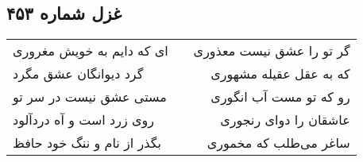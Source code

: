 \begin{center}
\section*{غزل شماره ۴۵۳}
\label{sec:sh453}
\begin{longtable}{l p{0.5cm} r}
ای که دایم به خویش مغروری
&&
گر تو را عشق نیست معذوری
\\
گرد دیوانگان عشق مگرد
&&
که به عقل عقیله مشهوری
\\
مستی عشق نیست در سر تو
&&
رو که تو مست آب انگوری
\\
روی زرد است و آه دردآلود
&&
عاشقان را دوای رنجوری
\\
بگذر از نام و ننگ خود حافظ
&&
ساغر می‌طلب که مخموری
\\
\end{longtable}
\end{center}
